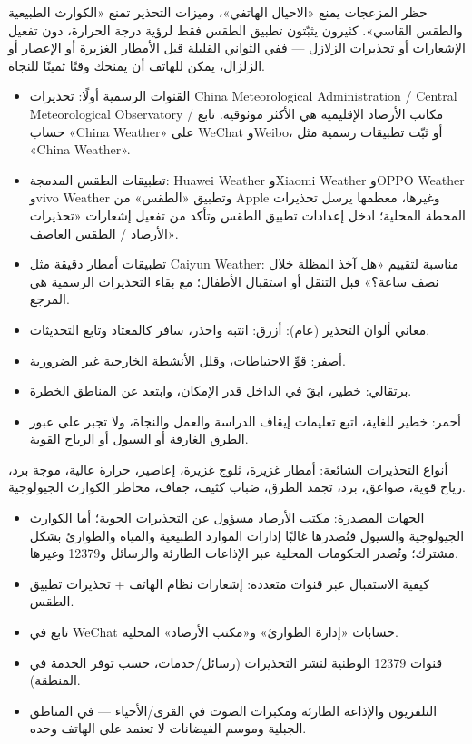 
حظر المزعجات يمنع «الاحيال الهاتفي»، وميزات التحذير تمنع «الكوارث الطبيعية والطقس القاسي». كثيرون يثبّتون تطبيق الطقس فقط لرؤية درجة الحرارة، دون تفعيل الإشعارات أو تحذيرات الزلازل — ففي الثواني القليلة قبل الأمطار الغزيرة أو الإعصار أو الزلزال، يمكن للهاتف أن يمنحك وقتًا ثمينًا للنجاة.


\begin{itemize}
  \item القنوات الرسمية أولًا: تحذيرات China Meteorological Administration / Central Meteorological Observatory / مكاتب الأرصاد الإقليمية هي الأكثر موثوقية. تابع حساب «China Weather» على WeChat وWeibo، أو ثبّت تطبيقات رسمية مثل «China Weather».
  \item تطبيقات الطقس المدمجة: Huawei Weather وXiaomi Weather وOPPO Weather وvivo Weather وتطبيق «الطقس» من Apple وغيرها، معظمها يرسل تحذيرات المحطة المحلية؛ ادخل إعدادات تطبيق الطقس وتأكد من تفعيل إشعارات «تحذيرات الأرصاد / الطقس العاصف».
  \item تطبيقات أمطار دقيقة مثل Caiyun Weather: مناسبة لتقييم «هل آخذ المظلة خلال نصف ساعة؟» قبل التنقل أو استقبال الأطفال؛ مع بقاء التحذيرات الرسمية هي المرجع.
  \item معاني ألوان التحذير (عام): أزرق: انتبه واحذر، سافر كالمعتاد وتابع التحديثات.
  \item أصفر: قوِّ الاحتياطات، وقلل الأنشطة الخارجية غير الضرورية.
  \item برتقالي: خطير، ابقَ في الداخل قدر الإمكان، وابتعد عن المناطق الخطرة.
  \item أحمر: خطير للغاية، اتبع تعليمات إيقاف الدراسة والعمل والنجاة، ولا تجبر على عبور الطرق الغارقة أو السيول أو الرياح القوية.
\end{itemize}

أنواع التحذيرات الشائعة: أمطار غزيرة، ثلوج غزيرة، إعاصير، حرارة عالية، موجة برد، رياح قوية، صواعق، برد، تجمد الطرق، ضباب كثيف، جفاف، مخاطر الكوارث الجيولوجية.


\begin{itemize}
  \item الجهات المصدرة: مكتب الأرصاد مسؤول عن التحذيرات الجوية؛ أما الكوارث الجيولوجية والسيول فتُصدرها غالبًا إدارات الموارد الطبيعية والمياه والطوارئ بشكل مشترك؛ وتُصدر الحكومات المحلية عبر الإذاعات الطارئة والرسائل و12379 وغيرها.
  \item كيفية الاستقبال عبر قنوات متعددة: إشعارات نظام الهاتف + تحذيرات تطبيق الطقس.
  \item تابع في WeChat حسابات «إدارة الطوارئ» و«مكتب الأرصاد» المحلية.
  \item قنوات 12379 الوطنية لنشر التحذيرات (رسائل/خدمات، حسب توفر الخدمة في المنطقة).
  \item التلفزيون والإذاعة الطارئة ومكبرات الصوت في القرى/الأحياء — في المناطق الجبلية وموسم الفيضانات لا تعتمد على الهاتف وحده.
\end{itemize}

